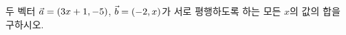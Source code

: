 두 벡터 $\vec{a}=(3x+1{,}\mkern3mu\mathopen{}-5)$, $\vec{b}=(-2{,}\mkern3mu\mathopen{}x)$가 서로 평행하도록 하는 모든 $x$의 값의 합을 구하시오.
